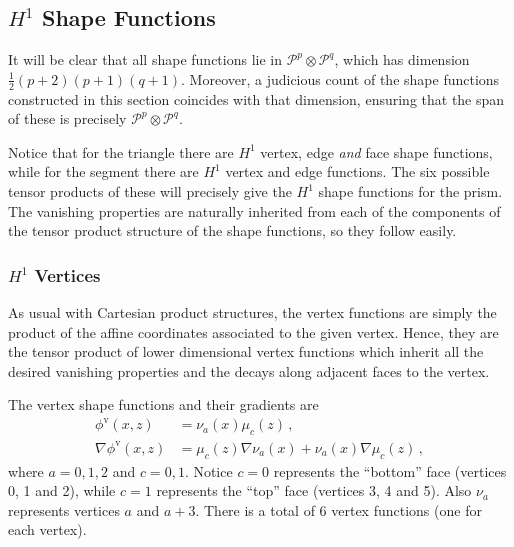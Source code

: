 \subsection{\texorpdfstring{$H^1$}{H1} Shape Functions}
It will be clear that all shape functions lie in $\mathcal{P}^p\otimes\mathcal{P}^q$, which has dimension $\frac{1}{2}(p+2)(p+1)(q+1)$. 
Moreover, a judicious count of the shape functions constructed in this section coincides with that dimension, ensuring that the span of these is precisely $\mathcal{P}^{p}\otimes\mathcal{P}^q$.

Notice that for the triangle there are $H^1$ vertex, edge \textit{and} face shape functions, while for the segment there are $H^1$ vertex and edge functions. 
The six possible tensor products of these will precisely give the $H^1$ shape functions for the prism.
The vanishing properties are naturally inherited from each of the components of the tensor product structure of the shape functions, so they follow easily.

\subsubsection {\texorpdfstring{$H^1$}{H1} Vertices}
\label{sec:PrismH1vertices}

As usual with Cartesian product structures, the vertex functions are simply the product of the affine coordinates associated to the given vertex. 
Hence, they are the tensor product of lower dimensional vertex functions which inherit all the desired vanishing properties and the decays along adjacent faces to the vertex.

The vertex shape functions and their gradients are
\begin{equation} 
	\begin{aligned}	
		\phi^\mathrm{v}(x,z)&=\nu_a(x)\mu_c(z)\,,\\
		\nabla\phi^\mathrm{v}(x,z)&=\mu_c(z)\nabla\nu_a(x)+\nu_a(x)\nabla\mu_c(z)\,,
	\end{aligned}		
\end{equation}
where $a=0,1,2$ and $c=0,1$. 
Notice $c=0$ represents the ``bottom'' face (vertices 0, 1 and 2), while $c=1$ represents the ``top'' face (vertices 3, 4 and 5).
Also $\nu_a$ represents vertices $a$ and $a+3$. 
There is a total of $6$ vertex functions (one for each vertex).

